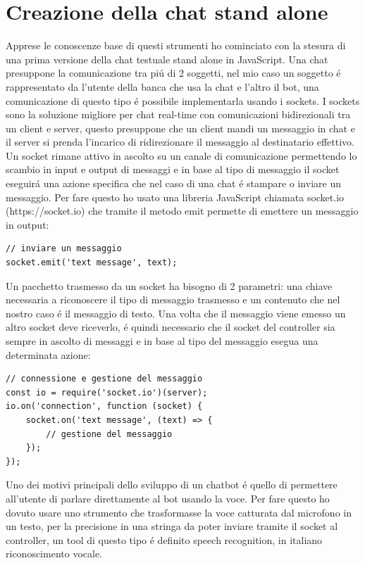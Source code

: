 \section{Creazione della chat stand alone}
Apprese le conoscenze base di questi strumenti ho cominciato con la stesura di una prima versione della chat testuale stand alone in JavaScript. Una chat presuppone la comunicazione tra pi\'u di 2 soggetti, nel mio caso un soggetto \'e rappresentato da l'utente della banca che usa la chat e l'altro il bot, una comunicazione di questo tipo \'e possibile implementarla usando i sockets.
I sockets sono la soluzione migliore per chat real-time con comunicazioni bidirezionali tra un client e server, questo presuppone che un client mandi un messaggio in chat e il server si prenda l'incarico di ridirezionare il messaggio al destinatario effettivo. Un socket rimane attivo in ascolto su un canale di comunicazione permettendo lo scambio in input e output di messaggi e in base al tipo di messaggio il socket eseguir\'a una azione specifica che nel caso di una chat \'e stampare o inviare un messaggio. Per fare questo ho usato una libreria JavaScript chiamata socket.io (https://socket.io) che tramite il metodo emit permette di emettere un messaggio in output:
\begin{lstlisting}
// inviare un messaggio
socket.emit('text message', text);
\end{lstlisting} 
Un pacchetto trasmesso da un socket ha bisogno di 2 parametri: una chiave necessaria a riconoscere il tipo di messaggio trasmesso e un contenuto che nel nostro caso \'e il messaggio di testo.
Una volta che il messaggio viene emesso un altro socket deve riceverlo, \'e quindi necessario che il socket del controller sia sempre in ascolto di messaggi e in base al tipo del messaggio esegua una determinata azione:
\begin{lstlisting}
// connessione e gestione del messaggio
const io = require('socket.io')(server);
io.on('connection', function (socket) {
    socket.on('text message', (text) => {
        // gestione del messaggio
    });
});
\end{lstlisting}

Uno dei motivi principali dello sviluppo di un chatbot \'e quello di permettere all'utente di parlare direttamente al bot usando la voce. Per fare questo ho dovuto usare uno strumento che trasformasse la voce catturata dal microfono in un testo, per la precisione in una stringa da poter inviare tramite il socket al controller, un tool di questo tipo \'e definito speech recognition, in italiano riconoscimento vocale.
